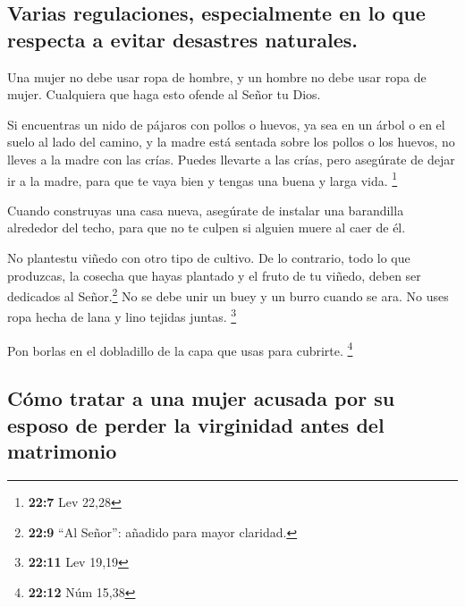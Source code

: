\hypertarget{varias-regulaciones-especialmente-en-lo-que-respecta-a-evitar-desastres-naturales.}{%
\subsection{Varias regulaciones, especialmente en lo que respecta a
evitar desastres
naturales.}\label{varias-regulaciones-especialmente-en-lo-que-respecta-a-evitar-desastres-naturales.}}

 Una mujer no debe usar ropa de hombre, y un hombre no
debe usar ropa de mujer. Cualquiera que haga esto ofende al Señor tu
Dios.

 Si encuentras un nido de pájaros con pollos o huevos, ya
sea en un árbol o en el suelo al lado del camino, y la madre está
sentada sobre los pollos o los huevos, no lleves a la madre con las
crías.  Puedes llevarte a las crías, pero asegúrate de
dejar ir a la madre, para que te vaya bien y tengas una buena y larga
vida. \footnote{\textbf{22:7} Lev 22,28}

 Cuando construyas una casa nueva, asegúrate de instalar
una barandilla alrededor del techo, para que no te culpen si alguien
muere al caer de él.

 No plantestu viñedo con otro tipo de cultivo. De lo
contrario, todo lo que produzcas, la cosecha que hayas plantado y el
fruto de tu viñedo, deben ser dedicados al Señor.\footnote{\textbf{22:9}
  ``Al Señor'': añadido para mayor claridad.}  No se debe
unir un buey y un burro cuando se ara.  No uses ropa
hecha de lana y lino tejidas juntas. \footnote{\textbf{22:11} Lev 19,19}

 Pon borlas en el dobladillo de la capa que usas para
cubrirte. \footnote{\textbf{22:12} Núm 15,38}

\hypertarget{cuxf3mo-tratar-a-una-mujer-acusada-por-su-esposo-de-perder-la-virginidad-antes-del-matrimonio}{%
\subsection{Cómo tratar a una mujer acusada por su esposo de perder la
virginidad antes del
matrimonio}\label{cuxf3mo-tratar-a-una-mujer-acusada-por-su-esposo-de-perder-la-virginidad-antes-del-matrimonio}}

